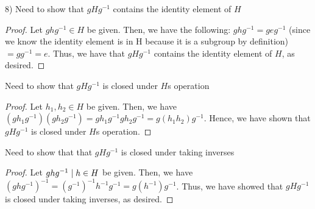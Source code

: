 \documentclass[executivepaper]{article}
\begin{document}
\begin{flushleft}

8) Need to show that $gHg^{-1}$ contains the identity element of $H$

\begin{center}

\begin{proof}

Let $ghg^{-1} \in H$ be given. Then, we have the following: $ghg^{-1}=geg^{-1}$ (since we know the identity element is in H because it is a subgroup by definition)$=gg^{-1}=e$. Thus, we have that $gHg^{-1}$ contains the identity element of $H$, as desired.

\end{proof}

\end{center}

Need to show that $gHg^{-1}$ is closed under $H$\textsc{}s operation

\begin{center}

\begin{proof}

Let $h_{1}, h_{2} \in H$ be given. Then, we have $(gh_{1}g^{-1})(gh_{2}g^{-1})=gh_{1}g^{-1}gh_{2}g^{-1}=g(h_{1}h_{2})g^{-1}$. Hence, we have shown that $gHg^{-1}$ is closed under $H$\textsc{}s operation.

\end{proof}

\end{center}

Need to show that that $gHg^{-1}$ is closed under taking inverses

\begin{center}

\begin{proof}

Let $ghg^{-1} \hspace{1mm} | \hspace{1mm} h \in H$ be given. Then, we have $(ghg^{-1})^{-1}=(g^{-1})^{-1}h^{-1}g^{-1}=g(h^{-1})g^{-1}$. Thus, we have showed that $gHg^{-1}$ is closed under taking inverses, as desired.

\end{proof}

\end{center}

\end{flushleft}
\end{document}
